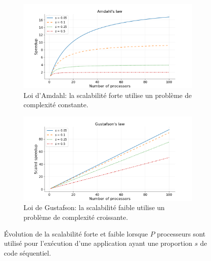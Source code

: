             \begin{figure}[t!]
                \centering
                \begin{subfigure}[t]{0.48\textwidth}
                    \centering
                    \includegraphics[width=1.05\linewidth]{images/scaling_amdahl.png}
                    \caption{\label{fig:scaling_amdahl}Loi d'Amdahl: la scalabilité forte utilise un problème de complexité constante.}
                \end{subfigure}\hfill
            \begin{subfigure}[t]{0.48\textwidth}
                    \centering
                    \includegraphics[width=1.05\linewidth]{images/scaling_gustafson.png}
                    \caption{\label{fig:scaling_gustafson}Loi de Gustafson: la scalabilité faible utilise un problème de complexité croissante.}
                \end{subfigure}
                \caption{\label{fig:scaling} Évolution de la scalabilité forte et faible lorsque $P$ processeurs sont utilisé pour l'exécution d'une application ayant une proportion $s$ de code séquentiel\protect\footnotemark.}
            \end{figure}
            

